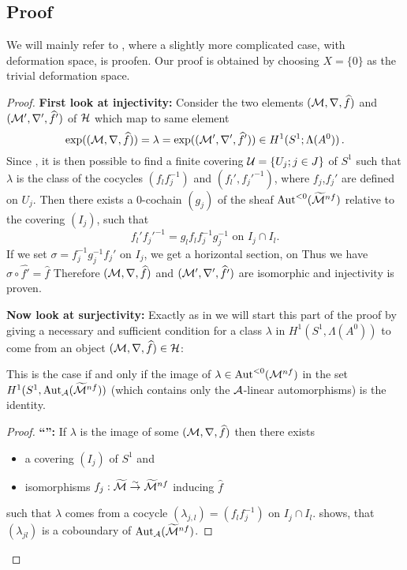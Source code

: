 \subsection{Proof}
We will mainly refer to \cite[section 6.d]{sabbah2007isomonodromic}, where a
slightly more complicated case, with deformation space, is proofen. Our proof is
obtained by choosing $X=\{0\}$ as the trivial deformation space.
\begin{comment}
  See also \cite{BJL1979Birkhoff} and \cite{babbitt1989local} although the proof
  goes back to work from Malgrange and Sibuya (see for example
  \cite{sibuya1990Linear}).
\end{comment}
\begin{proof}
  \textbf{First look at injectivity:}
  Consider the two elements $(\mathcal{M},\nabla,\widehat f)$ and $(\mathcal{M}',\nabla',\widehat f')$
  of $\mathcal{H}$ which map to same element
  \[
    \exp((\mathcal{M},\nabla,\widehat f))=\lambda=\exp((\mathcal{M}',\nabla',\widehat f'))
      \in H^1(S^1;\Lambda(A^0)) \,.
  \]
  Since \TODO{}, it is then possible to find a finite covering
  $\mathcal{U}=\{U_j;j\in J\}$ of $S^1$ such that $\lambda$ is the class of the
  cocycles $(f_lf_j^{-1})$ and $(f_l',f_j'^{-1})$, where $f_j$,$f_j'$ are
  defined on $U_j$.
  Then there exists \TODO{} a $0$-cochain $(g_j)$ of the sheaf
  $\operatorname{Aut}^{<0}(\widetilde{\mathcal{M}}^{nf})$ relative to the covering $(I_j)$, such that
  \[
    f_l'f_j'^{-1}=g_lf_lf_j^{-1}g_j^{-1} \text{ on } I_j\cap I_l.
  \]
  If we set $\sigma=f_j^{-1}g_{j}^{-1}f_j'$ on $I_{j}$, we get a horizontal
  section, on \TODO{}
  Thus we have $\sigma\circ\hat{f'}=\hat f$ Therefore $(\mathcal{M},\nabla,\widehat f)$ and
  $(\mathcal{M}',\nabla',\widehat{f'})$ are isomorphic and injectivity is proven.

  \textbf{Now look at surjectivity:}
  Exactly as in \cite{sabbah2007isomonodromic} we will start this part of the proof by giving a
  necessary and sufficient condition for a class $\lambda$ in
  $H^1(S^1,\Lambda(A^0))$
  \TODO[$\Lambda(A^0)\hat{=}\Aut^{<0}(\tilde\cM^{nf})$ or
  $\Aut^{<0}(\cM^{nf})$?]
  to come from an object
  $(\mathcal{M},\nabla,\widehat f)\in\mathcal{H}$:
  \begin{einr}
    This is the case if and only if the image of
    $\lambda\in\operatorname{Aut}^{<0}(\mathcal{M}^{nf})$ in the set
    $H^1(S^1,\operatorname{Aut}_{\mathcal{A}}(\widetilde{\mathcal{M}}^{nf}))$ (which contains only the
    $\mathcal{A}$-linear automorphisms) is the identity.
  \end{einr}
  \begin{proof}
    \textbf{``\Rightarrow{}'':}
    If $\lambda$ is the image of some $(\mathcal{M},\nabla,\widehat f)$ then there exists
    \begin{itemize}
      \item a covering $(I_{j})$ of $S^1$ and
      \item isomorphisms $f_j:\widetilde{\mathcal{M}}\overset{\sim}\to\widetilde{\mathcal{M}}^{nf}$
        inducing $\hat f$
    \end{itemize}
    such that $\lambda$ comes from a cocycle $(\lambda_{j,l})=(f_lf_j^{-1})$ on
    $I_j\cap I_l$.
    \TODO{} shows, that $(\lambda_{jl})$ is a coboundary of
    $\operatorname{Aut}_\mathcal{A}(\widetilde{\mathcal{M}}^{nf})$.


\end{proof}
\end{proof}
